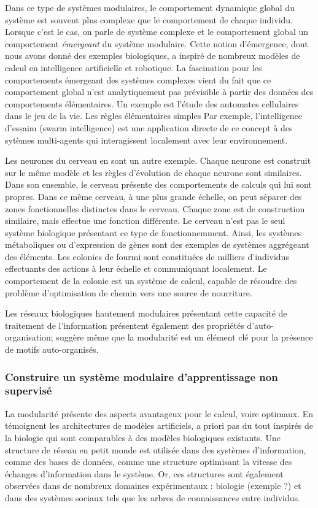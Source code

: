 Dans ce type de systèmes modulaires, le comportement dynamique global du système est souvent plus complexe que le comportement de chaque individu. Lorsque c'est le cas, on parle de système complexe et le comportement global un comportement \emph{émergeant} du système modulaire. Cette notion d'émergence, dont nous avons donné des exemples biologiques, a inspiré de nombreux modèles de calcul en intelligence artificielle et robotique.
La fascination pour les comportements émergeant des systèmes complexes vient du fait que ce comportement global n'est analytiquement pas prévisible à partir des données des comportements élémentaires.
Un exemple est l'étude des automates cellulaires dans le jeu de la vie. 
Les règles élémentaires simples 
Par exemple, l'intelligence d'essaim (swarm intelligence) est une application directe de ce concept à des sytèmes multi-agents qui interagissent localement avec leur environnement. 

Les neurones du cerveau en sont un autre exemple. Chaque neurone est construit sur le même modèle et les règles d'évolution de chaque neurone sont similaires. Dans son ensemble, le cerveau présente des comportements de calculs qui lui sont propres.
Dans ce même cerveau, à  une plus grande échelle, on peut séparer des zones fonctionnelles distinctes dans le cerveau. Chaque zone est de construction similaire, mais effectue une fonction différente.
Le cerveau n'est pas le seul système biologique présentant ce type de fonctionnemment. Ainsi, les systèmes métaboliques ou d'expression de gènes sont des exemples de systèmes aggrégeant des éléments.
Les colonies de fourmi sont constituées de milliers d'individus effectuants des actions à leur échelle et communiquant localement. Le comportement de la colonie est un système de calcul, capable de résoudre des problème d'optimisation de chemin vers une source de nourriture.

Les réseaux biologiques hautement modulaires présentant cette capacité de traitement de l'information présentent également des propriétés d'auto-organisation; \cite{Siebert2020RoleOM} suggère même que la modularité est un élément clé pour la présence de motifs auto-organisés. 

\subsubsection{Construire un système modulaire d'apprentissage non supervisé}

La modularité présente des aspects avantageux pour le calcul, voire optimaux. En témoignent les architectures de modèles artificiels, a priori pas du tout inspirés de la biologie qui sont comparables à des modèles biologiques existants. 
Une structure de réseau en petit monde est  utilisée dans des systèmes d'information, comme des bases de données, comme une structure optimisant la vitesse des échanges d'information dans le système. Or, ces structures sont également observées dans de nombreux domaines expérimentaux : biologie (exemple ?) et dans des systèmes sociaux tels que les arbres de connaissances entre individus. 

